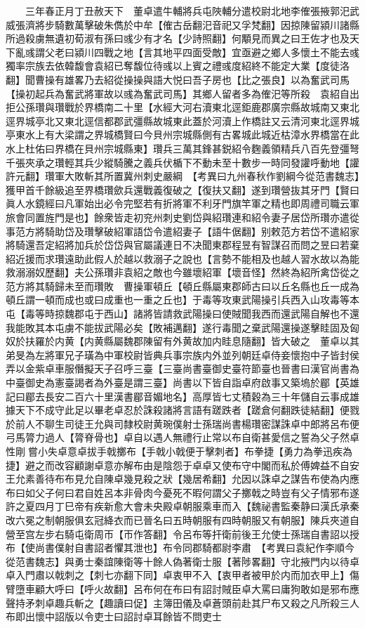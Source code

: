 　　三年春正月丁丑赦天下　董卓遣牛輔將兵屯陜輔分遣校尉北地李傕張掖郭汜武威張濟將步騎數萬擊破朱儁於中牟【傕古岳翻汜音祀又孚梵翻】因掠陳留潁川諸縣所過殺虜無遺初荀淑有孫曰彧少有才名【少詩照翻】何顒見而異之曰王佐才也及天下亂彧謂父老曰潁川四戰之地【言其地平四面受敵】宜亟避之鄉人多懷土不能去彧獨率宗族去依韓馥會袁紹已奪馥位待彧以上賓之禮彧度紹終不能定大業【度徒洛翻】聞曹操有雄畧乃去紹從操操與語大悦曰吾子房也【比之張良】以為奮武司馬【操初起兵為奮武將軍故以彧為奮武司馬】其鄉人留者多為傕汜等所殺　袁紹自出拒公孫瓚與瓚戰於界橋南二十里【水經大河右瀆東北逕鉅鹿郡廣宗縣故城南又東北逕界城亭北又東北逕信都郡武彊縣故城東此蓋於河瀆上作橋註又云清河東北逕界城亭東水上有大梁謂之界城橋賢曰今貝州宗城縣側有古畧城此城近枯漳水界橋當在此水上杜佑曰界橋在貝州宗城縣東】瓚兵三萬其鋒甚鋭紹令麴義領精兵八百先登彊弩千張夾承之瓚輕其兵少縱騎騰之義兵伏楯下不動未至十數步一時同發讙呼動地【讙許元翻】瓚軍大敗斬其所置冀州刺史嚴綱　【考異曰九州春秋作劉綱今從范書魏志】獲甲首千餘級追至界橋瓚歛兵還戰義復破之【復扶又翻】遂到瓚營抜其牙門【賢曰眞人水鏡經曰凡軍始出必令完堅若有折將軍不利牙門旗竿軍之精也即周禮司職云軍旅會同置旌門是也】餘衆皆走初兖州刺史劉岱與紹瓚連和紹令妻子居岱所瓚亦遣從事范方將騎助岱及瓚擊破紹軍語岱令遣紹妻子【語牛倨翻】别敕范方若岱不遣紹家將騎還吾定紹將加兵於岱岱與官屬議連日不决聞東郡程昱有智謀召而問之昱曰若棄紹近援而求瓚遠助此假人於越以救溺子之說也【言勢不能相及也越人習水故以為能救溺溺奴歷翻】夫公孫瓚非袁紹之敵也今雖壞紹軍【壞音怪】然終為紹所禽岱從之范方將其騎歸未至而瓚敗　曹操軍頓丘【頓丘縣屬東郡師古曰以丘名縣也丘一成為頓丘謂一頓而成也或曰成重也一重之丘也】于毒等攻東武陽操引兵西入山攻毒等本屯【毒等時掠魏郡屯于西山】諸將皆請救武陽操曰使賊聞我西而還武陽自解也不還我能敗其本屯虜不能拔武陽必矣【敗補邁翻】遂行毒聞之棄武陽還操遂擊眭固及匈奴於扶羅於内黄【内黄縣屬魏郡陳留有外黄故加内眭息隨翻】皆大破之　董卓以其弟旻為左將軍兄子璜為中軍校尉皆典兵事宗族内外並列朝廷卓侍妾懷抱中子皆封侯弄以金紫卓車服僭擬天子召呼三臺【三臺尚書臺御史臺符節臺也晉書曰漢官尚書為中臺御史為憲臺謁者為外臺是謂三臺】尚書以下皆自詣卓府啟事又築塢於郿【英雄記曰郿去長安二百六十里漢書郿音媚地名】高厚皆七丈積穀為三十年儲自云事成雄據天下不成守此足以畢老卓忍於誅殺諸將言語有蹉跌者【蹉倉何翻跌徒結翻】便戮於前人不聊生司徒王允與司隸校尉黄琬僕射士孫瑞尚書楊瓚密謀誅卓中郎將呂布便弓馬膂力過人【膂脊骨也】卓自以遇人無禮行止常以布自衛甚愛信之誓為父子然卓性剛嘗小失卓意卓拔手戟擲布【手戟小戟便于擊刺者】布拳捷【勇力為拳迅疾為捷】避之而改容顧謝卓意亦解布由是陰怨于卓卓又使布守中閣而私於傅婢益不自安王允素善待布布見允自陳卓幾見殺之狀【幾居希翻】允因以誅卓之謀告布使為内應布曰如父子何曰君自姓呂本非骨肉今憂死不暇何謂父子擲戟之時豈有父子情邪布遂許之夏四月丁巳帝有疾新愈大會未央殿卓朝服乘車而入【魏祕書監秦静曰漢氏承秦改六冕之制朝服俱玄冠絳衣而已晉名曰五時朝服有四時朝服又有朝服】陳兵夾道自營至宫左步右騎屯衛周帀【帀作答翻】令呂布等扞衛前後王允使士孫瑞自書詔以授布【使尚書僕射自書詔者懼其泄也】布令同郡騎都尉李肅　【考異曰袁紀作李順今從范書魏志】與勇士秦誼陳衛等十餘人偽著衛士服【著陟畧翻】守北掖門内以待卓卓入門肅以戟刺之【刺七亦翻下同】卓衷甲不入【衷甲者被甲於内而加衣甲上】傷臂墮車顧大呼曰【呼火故翻】呂布何在布曰有詔討賊臣卓大罵曰庸狗敢如是邪布應聲持矛刺卓趣兵斬之【趣讀曰促】主簿田儀及卓蒼頭前赴其尸布又殺之凡所殺三人布即出懷中詔版以令吏士曰詔討卓耳餘皆不問吏士